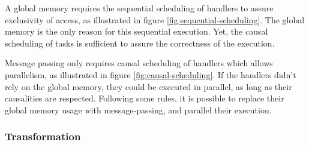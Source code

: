 A global memory requires the sequential scheduling of handlers to assure exclusivity of access, as illustrated in figure \ref{fig:sequential-scheduling}. %
The global memory is the only reason for this sequential execution.
Yet, the causal scheduling of tasks is sufficient to assure the correctness of the execution.

Message passing only requires causal scheduling of handlers which allows parallelism, as illustrated  in figure \ref{fig:causal-scheduling}.
If the handlers didn't rely on the global memory, they could be executed in parallel, as long as their causalities are respected.
Following some rules, it is possible to replace their global memory usage with message-passing, and parallel their execution.

\subsubsection{Transformation}


